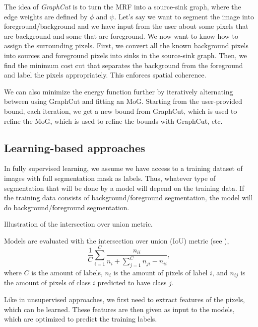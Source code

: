 The idea of \textit{GraphCut} is to turn the MRF into a source-sink graph,
where the edge weights are defined by $\phi$ and $\psi$. Let's say we want to
segment the image into foreground/background and we have input
from the user about some pixels that are background and some that are
foreground. We now want to know how to assign the surrounding pixels. First, we
convert all the known background pixels into sources and foreground pixels into
sinks in the source-sink graph. Then, we find the minimum cost cut that
separates the background from the foreground and label the pixels
appropriately. This enforces spatial coherence.

We can also minimize the energy function further by iteratively alternating
between using GraphCut and fitting an MoG. Starting from the user-provided
bound, each iteration, we get a new bound from GraphCut, which is used to
refine the MoG, which is used to refine the bounds with GraphCut, etc.

\subsection{Learning-based approaches}

In fully supervised learning, we assume we have access to a training dataset
of images with full segmentation mask as labels. Thus, whatever type of
segmentation that will be done by a model will depend on the training data.
If the training data consists of background/foreground segmentation, the
model will do background/foreground segmentation.

\begin{marginfigure}
    \centering
    \caption{Illustration of the intersection over union metric.}
    \label{fig:intersection-over-union-metric}
\end{marginfigure}

Models are evaluated with the intersection over union (IoU) metric (see
), \[
  \frac{1}{C} \sum_{i=1}^C \frac{n_{ii}}{n_i + \sum_{j=1}^C n_{ji} - n_{ii}}
,\]
where $C$ is the amount of labels, $n_i$ is the amount of pixels of label
$i$, and $n_{ij}$ is the amount of pixels of class $i$ predicted to have
class $j$.

Like in unsupervised approaches, we first need to extract features of the
pixels, which can be learned. These features are then given as input to the
models, which are optimized to predict the training labels.

